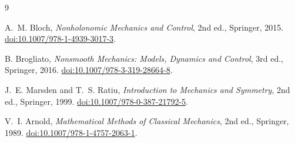 \documentclass[11pt,a4paper]{article}
\theoremstyle{definition}
\theoremstyle{plain}
\theoremstyle{remark}
\begin{document}
\begin{thebibliography}{9}

A.~M. Bloch, \emph{Nonholonomic Mechanics and Control}, 2nd ed.,
Springer, 2015. \href{https://doi.org/10.1007/978-1-4939-3017-3}
{doi:10.1007/978-1-4939-3017-3}.

B. Brogliato, \emph{Nonsmooth Mechanics: Models, Dynamics and
Control}, 3rd ed., Springer, 2016.
\href{https://doi.org/10.1007/978-3-319-28664-8}
{doi:10.1007/978-3-319-28664-8}.

J.~E. Marsden and T.~S. Ratiu,
\emph{Introduction to Mechanics and Symmetry}, 2nd ed., Springer,
1999. \href{https://doi.org/10.1007/978-0-387-21792-5}
{doi:10.1007/978-0-387-21792-5}.

V.~I. Arnold, \emph{Mathematical Methods of Classical Mechanics},
2nd ed., Springer, 1989.
\href{https://doi.org/10.1007/978-1-4757-2063-1}
{doi:10.1007/978-1-4757-2063-1}.

\end{thebibliography}
\end{document}
